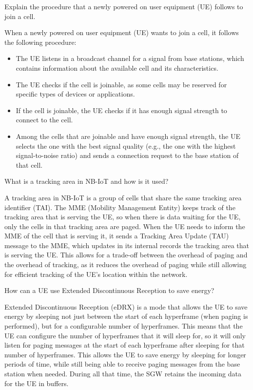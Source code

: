 \begin{ejercicio}
    Explain the procedure that a newly powered on user equipment (UE) follows to join a cell.

    When a newly powered on user equipment (UE) wants to join a cell, it follows the following procedure:
\begin{itemize}
    \item The UE listens in a broadcast channel for a signal from base stations, which contains information about the available cell and its characteristics.
    \item The UE checks if the cell is joinable, as some cells may be reserved for specific types of devices or applications.
    \item If the cell is joinable, the UE checks if it has enough signal strength to connect to the cell.
    \item Among the cells that are joinable and have enough signal strength, the UE selects the one with the best signal quality (e.g., the one with the highest signal-to-noise ratio) and sends a connection request to the base station of that cell.
\end{itemize}
\end{ejercicio}

\begin{ejercicio}
    What is a tracking area in NB-IoT and how is it used?

    A tracking area in NB-IoT is a group of cells that share the same tracking area identifier (TAI). The MME (Mobility Management Entity) keeps track of the tracking area that is serving the UE, so when there is data waiting for the UE, only the cells in that tracking area are paged. When the UE needs to inform the MME of the cell that is serving it, it sends a Tracking Area Update (TAU) message to the MME, which updates in its internal records the tracking area that is serving the UE. This allows for a trade-off between the overhead of paging and the overhead of tracking, as it reduces the overhead of paging while still allowing for efficient tracking of the UE's location within the network.
\end{ejercicio}

\begin{ejercicio}
    How can a UE use Extended Discontinuous Reception to save energy?

    Extended Discontinuous Reception (eDRX) is a mode that allows the UE to save energy by sleeping not just between the start of each hyperframe (when paging is performed), but for a configurable number of hyperframes. This means that the UE can configure the number of hyperframes that it will sleep for, so it will only listen for paging messages at the start of each hyperframe after sleeping for that number of hyperframes. This allows the UE to save energy by sleeping for longer periods of time, while still being able to receive paging messages from the base station when needed. During all that time, the SGW retains the incoming data for the UE in buffers.
\end{ejercicio}


